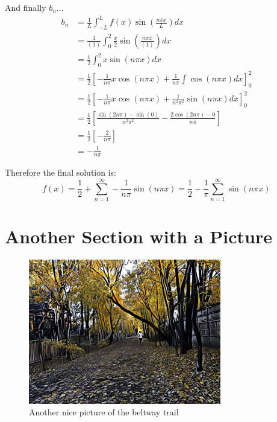\documentclass[10pt,letterpaper,twoside,final]{memoir}
\begin{document}
And finally $b_n$...
\begin{align*}
b_n &= \frac{1}{L} \int_{-L}^L f(x) \sin \left( \frac{n\pi x}{L} \right) dx \\
    &= \frac{1}{(1)} \int_0^2 \frac{x}{2} \sin \left( \frac{n\pi x}{(1)} \right) dx \\
    &= \frac{1}{2} \int_0^2 x \sin \left( n\pi x \right) dx \\
    &= \frac{1}{2} \left[ - \frac{1}{n\pi} x \cos \left( n\pi x \right) + \frac{1}{n\pi} \int \cos \left( n\pi x \right) dx \right]^2_0 \\
    &= \frac{1}{2} \left[ - \frac{1}{n\pi} x \cos \left( n\pi x \right) + \frac{1}{n^2\pi^2} \sin \left( n\pi x \right) dx \right]^2_0 \\
    &= \frac{1}{2} \left[ \frac{\sin (2n\pi) - \sin(0)}{ n^2\pi^2 } - \frac{2\cos(2n\pi) - 0 }{n\pi} \right] \\
    &= \frac{1}{2} \left[ -\frac{2}{n\pi} \right] \\
    &= - \frac{1}{n\pi}
\end{align*}

Therefore the final solution is:
\[
f(x) = \frac{1}{2} + \sum_{n=1}^\infty -\frac{1}{n\pi} \sin (n\pi x) = \frac{1}{2} - \frac{1}{\pi} \sum_{n=1}^\infty \sin (n\pi x)
\]

\lipsum[8]

\section{Another Section with a Picture}


\lipsum[95]
\begin{figure}
\centering
\includegraphics[width=0.75\textwidth]{TrailPic2}
\caption{\label{fig:pathB}Another nice picture of the beltway trail}
\end{figure}
\end{document}
